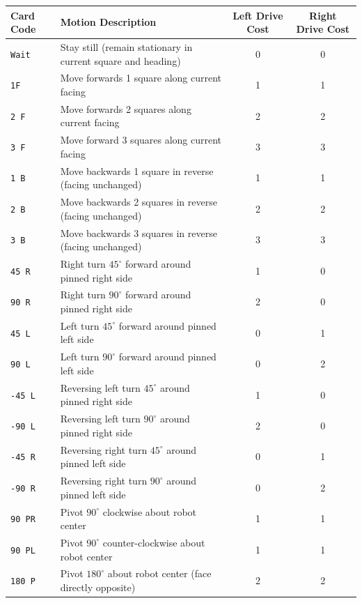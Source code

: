 \documentclass[11pt,a4paper]{article}
\begin{document}
\noindent
\begin{center}
{\small
\begin{tabularx}{\textwidth}{l X c c}
  \toprule
  \textbf{Card Code} & \textbf{Motion Description} & \textbf{Left Drive Cost} & \textbf{Right Drive Cost} \\
  \midrule
  \texttt{Wait} & Stay still (remain stationary in current square and heading) & 0 & 0 \\
  \midrule
  \texttt{1F} & Move forwards 1 square along current facing & 1 & 1 \\
  \texttt{2 F} & Move forwards 2 squares along current facing & 2 & 2 \\
  \texttt{3 F} & Move forward 3 squares along current facing & 3 & 3 \\
  \midrule
  \texttt{1 B} & Move backwards 1 square in reverse (facing unchanged) & 1 & 1 \\
  \texttt{2 B} & Move backwards 2 squares in reverse (facing unchanged) & 2 & 2 \\
  \texttt{3 B} & Move backwards 3 squares in reverse (facing unchanged) & 3 & 3 \\
  \midrule
  \texttt{45 R} & Right turn $45^\circ$ forward around pinned right side & 1 & 0 \\
  \texttt{90 R} & Right turn $90^\circ$ forward around pinned right side & 2 & 0 \\
  \texttt{45 L} & Left turn $45^\circ$ forward around pinned left side & 0 & 1 \\
  \texttt{90 L} & Left turn $90^\circ$ forward around pinned left side & 0 & 2 \\
  \midrule
  \texttt{-45 L} & Reversing left turn $45^\circ$ around pinned right side & 1 & 0 \\
  \texttt{-90 L} & Reversing left turn $90^\circ$ around pinned right side & 2 & 0 \\
  \texttt{-45 R} & Reversing right turn $45^\circ$ around pinned left side & 0 & 1 \\
  \texttt{-90 R} & Reversing right turn $90^\circ$ around pinned left side & 0 & 2 \\
  \midrule
  \texttt{90 PR} & Pivot $90^\circ$ clockwise about robot center & 1 & 1 \\
  \texttt{90 PL} & Pivot $90^\circ$ counter-clockwise about robot center & 1 & 1 \\
  \texttt{180 P} & Pivot $180^\circ$ about robot center (face directly opposite) & 2 & 2 \\
  \bottomrule
\end{tabularx}
}
\end{center}
\end{document}

